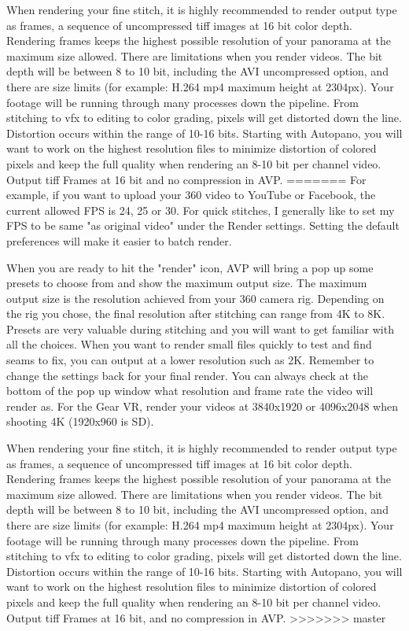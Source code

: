 \begin{fullwidth}
When rendering your fine stitch, it is highly recommended to render output type as frames, a sequence of uncompressed tiff images at 16 bit color depth. Rendering frames keeps the highest possible resolution of your panorama at the maximum size allowed. There are limitations when you render videos. The bit depth will be between 8 to 10 bit, including the AVI uncompressed option, and there are size limits (for example: H.264 mp4 maximum height at 2304px). Your footage will be running through many processes down the pipeline. From stitching to vfx to editing to color grading, pixels will get distorted down the line. Distortion occurs within the range of 10-16 bits. Starting with Autopano, you will want to work on the highest resolution files to minimize distortion of colored pixels and keep the full quality when rendering an 8-10 bit per channel video. Output tiff Frames at 16 bit and no compression in AVP.
=======
For example, if you want to upload your 360 video to YouTube or Facebook, the current allowed FPS is 24, 25 or 30. For quick stitches, I generally like to set my FPS to be same "as original video" under the Render settings. Setting the default preferences will make it easier to batch render.


When you are ready to hit the "render" icon, AVP will bring a pop up some presets to choose from and show the maximum output size. The maximum output size is the resolution achieved from your 360 camera rig. Depending on the rig you chose, the final resolution after stitching can range from 4K to 8K. Presets are very valuable during stitching and you will want to get familiar with all the choices. When you want to render small files quickly to test and find seams to fix, you can output at a lower resolution such as 2K. Remember to change the settings back for your final render. You can always check at the bottom of the pop up window what resolution and frame rate the video will render as. For the Gear VR, render your videos at 3840x1920 or 4096x2048 when shooting 4K (1920x960 is SD).

When rendering your fine stitch, it is highly recommended to render output type as frames, a sequence of uncompressed tiff images at 16 bit color depth. Rendering frames keeps the highest possible resolution of your panorama at the maximum size allowed. There are limitations when you render videos. The bit depth will be between 8 to 10 bit, including the AVI uncompressed option, and there are size limits (for example: H.264 mp4 maximum height at 2304px). Your footage will be running through many processes down the pipeline. From stitching to vfx to editing to color grading, pixels will get distorted down the line. Distortion occurs within the range of 10-16 bits. Starting with Autopano, you will want to work on the highest resolution files to minimize distortion of colored pixels and keep the full quality when rendering an 8-10 bit per channel video. Output tiff Frames at 16 bit, and no compression in AVP.
>>>>>>> master


\end{fullwidth}
